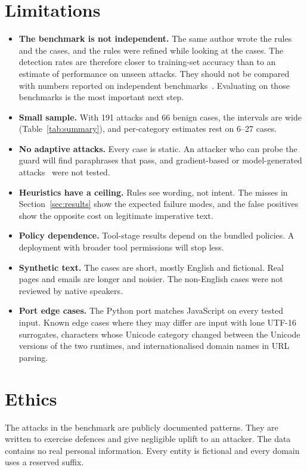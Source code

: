 \documentclass[10pt]{article}
\begin{document}
\section{Limitations}
\label{sec:limits}
\begin{itemize}
\item \textbf{The benchmark is not independent.} The same author wrote the rules and the cases, and the rules were refined while looking at the cases. The detection rates are therefore closer to training-set accuracy than to an estimate of performance on unseen attacks. They should not be compared with numbers reported on independent benchmarks~\citep{liu2024formalizing,yi2025bipia,zhan2024injecagent,debenedetti2024agentdojo}. Evaluating on those benchmarks is the most important next step.
\item \textbf{Small sample.} With 191 attacks and 66 benign cases, the intervals are wide (Table~\ref{tab:summary}), and per-category estimates rest on 6--27 cases.
\item \textbf{No adaptive attacks.} Every case is static. An attacker who can probe the guard will find paraphrases that pass, and gradient-based or model-generated attacks~\citep{zou2023universal} were not tested.
\item \textbf{Heuristics have a ceiling.} Rules see wording, not intent. The misses in Section~\ref{sec:results} show the expected failure modes, and the false positives show the opposite cost on legitimate imperative text.
\item \textbf{Policy dependence.} Tool-stage results depend on the bundled policies. A deployment with broader tool permissions will stop less.
\item \textbf{Synthetic text.} The cases are short, mostly English and fictional. Real pages and emails are longer and noisier. The non-English cases were not reviewed by native speakers.
\item \textbf{Port edge cases.} The Python port matches JavaScript on every tested input. Known edge cases where they may differ are input with lone UTF-16 surrogates, characters whose Unicode category changed between the Unicode versions of the two runtimes, and internationalised domain names in URL parsing.
\end{itemize}

\section{Ethics}
The attacks in the benchmark are publicly documented patterns. They are written to exercise defences and give negligible uplift to an attacker. The data contains no real personal information. Every entity is fictional and every domain uses a reserved suffix.
\end{document}
